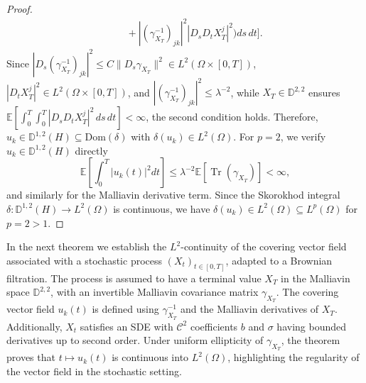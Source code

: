 \documentclass[]{interact}
\newcommand{\1}{\mathbf{1}}
\theoremstyle{plain}%
\theoremstyle{definition}
\theoremstyle{remark}
\numberwithin{equation}{section}
\begin{document}
\begin{proof}
\begin{align*}
&\quad + |(\gamma_{X_T}^{-1})_{j k}|^2 |D_s D_t X_T^j|^2 \Big) ds \, dt \bigg].
\end{align*}
%
Since \( |D_s (\gamma_{X_T}^{-1})_{j k}|^2 \leq C \|D_s \gamma_{X_T}\|^2 \in L^2(\Omega \times [0,T]) \), \( |D_t X_T^j|^2 \in L^2(\Omega \times [0,T]) \), and \( |(\gamma_{X_T}^{-1})_{j k}|^2 \leq \lambda^{-2} \), while \( X_T \in \mathbb{D}^{2,2} \) ensures \( \mathbb{E} \left[ \int_0^T \int_0^T |D_s D_t X_T^j|^2 \, ds \, dt \right] < \infty \), the second condition holds.
%
Therefore, \( u_k \in \mathbb{D}^{1,2}(H) \subseteq \text{Dom}(\delta) \) with \( \delta(u_k) \in L^2(\Omega) \).
%
For \( p = 2 \), we verify \( u_k \in \mathbb{D}^{1,2}(H) \) directly
\[
\mathbb{E}\left[ \int_0^T |u_k(t)|^2 dt \right] \leq \lambda^{-2} \mathbb{E}\left[ \operatorname{Tr}(\gamma_{X_T}) \right] < \infty,
\]
and similarly for the Malliavin derivative term. Since the Skorokhod integral \(\delta: \mathbb{D}^{1,2}(H) \to L^2(\Omega)\) is continuous, we have \(\delta(u_k) \in L^2(\Omega) \subseteq L^p(\Omega)\) for \(p = 2 > 1\).

\end{proof}

\noindent
In the next theorem we establish the \( L^2 \)-continuity of the covering vector field associated with a stochastic process \( (X_t)_{t \in [0, T]} \), adapted to a Brownian filtration. The process is assumed to have a terminal value \( X_T \) in the Malliavin space \( \mathbb{D}^{2,2} \), with an invertible Malliavin covariance matrix \( \gamma_{X_T} \). The covering vector field \( u_k(t) \) is defined using \( \gamma_{X_T}^{-1} \) and the Malliavin derivatives of \( X_T \). Additionally, \( X_t \) satisfies an SDE with \( \mathcal{C}^2 \) coefficients \( b \) and \( \sigma \) having bounded derivatives up to second order. Under uniform ellipticity of \( \gamma_{X_T} \), the theorem proves that \( t \mapsto u_k(t) \) is continuous into \( L^2(\Omega) \), highlighting the regularity of the vector field in the stochastic setting.


\end{document}
